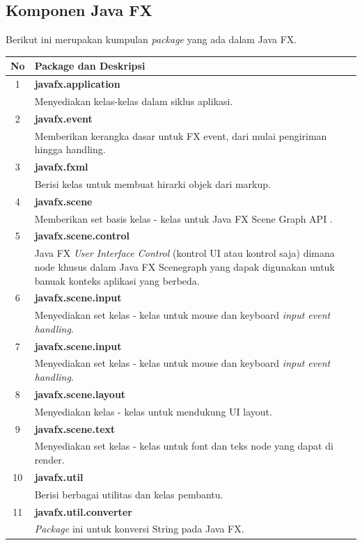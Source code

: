 \subsection{Komponen Java FX}
Berikut ini merupakan kumpulan \textit{package} yang ada dalam Java FX\cite{javafx3}.\\
	\begin{tabular}{|c|p{12cm}|}
		\hline
		\textbf{No} & \textbf{Package dan Deskripsi} \\ \hline \hline
		1 & \textbf{javafx.application}\\
			&	Menyediakan kelas-kelas dalam siklus aplikasi.\\ \hline
		2 & \textbf{javafx.event}\\
			&	Memberikan kerangka dasar untuk FX event, dari mulai pengiriman hingga handling.\\ \hline	
		3 & \textbf{javafx.fxml}\\
			&	Berisi kelas untuk membuat hirarki objek dari markup.\\ \hline
		4 & \textbf{javafx.scene}\\
			&	Memberikan set basis kelas - kelas untuk Java FX Scene Graph API .\\ \hline
		5 & \textbf{javafx.scene.control}\\
			&	Java FX \textit{User Interface Control }(kontrol UI atau kontrol saja) dimana node khusus dalam Java FX Scenegraph yang dapak digunakan untuk banuak konteks aplikasi yang berbeda.\\ \hline
		6 & \textbf{javafx.scene.input}\\
			&	Menyediakan set kelas - kelas untuk mouse dan keyboard \textit{input event handling}.\\ \hline
		7 & \textbf{javafx.scene.input}\\
			&	Menyediakan set kelas - kelas untuk mouse dan keyboard \textit{input event handling}.\\ \hline
		8 & \textbf{javafx.scene.layout}\\
			&	Menyediakan kelas - kelas untuk mendukung UI layout.\\ \hline
		9 & \textbf{javafx.scene.text}\\
			&	Menyediakan set kelas - kelas untuk font dan teks node yang dapat di render.\\ \hline
		10 & \textbf{javafx.util}\\
			&	Berisi berbagai utilitas dan kelas pembantu.\\ \hline
		11 & \textbf{javafx.util.converter}\\
			&	\textit{Package} ini untuk konversi String pada Java FX.\\ \hline
	\end{tabular}
